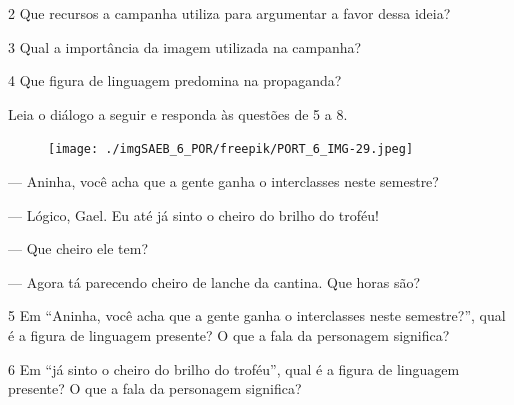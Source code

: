 
\num{2} Que recursos a campanha utiliza para argumentar a favor dessa
ideia?


\num{3} Qual a importância da imagem utilizada na campanha?


\num{4} Que figura de linguagem predomina na propaganda?



Leia o diálogo a seguir e responda às questões de 5 a 8.

\begin{myquote}
\begin{figure}[H]
\centering\texttt{[image: ./imgSAEB\_6\_POR/freepik/PORT\_6\_IMG-29.jpeg]}
\end{figure}

--- Aninha, você acha que a gente ganha o interclasses neste semestre?

\noindent --- Lógico, Gael. Eu até já sinto o cheiro do brilho do troféu!

\noindent --- Que cheiro ele tem?

\noindent --- Agora tá parecendo cheiro de lanche da cantina. Que horas são?
\end{myquote}

\num{5} Em ``Aninha, você acha que a gente ganha o interclasses neste
semestre?'', qual é a figura de linguagem presente? O que a fala da
personagem significa?


\num{6} Em ``já sinto o cheiro do brilho do troféu'', qual é a figura de
linguagem presente? O que a fala da personagem significa?


